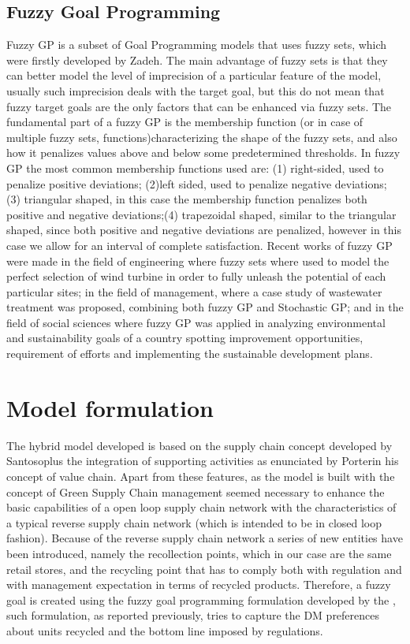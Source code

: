 \documentclass{article}
\begin{document}
  \subsection{Fuzzy Goal Programming}
  Fuzzy GP is a subset of Goal Programming models that uses fuzzy sets, which were firstly developed by Zadeh\cite{Zadeh_1965}. The main advantage of fuzzy sets is that they can better model the level of imprecision of a particular feature of the model, usually such imprecision deals with the target goal, but this do not mean that fuzzy target goals are the only factors that can be enhanced via fuzzy sets. The fundamental part of a fuzzy GP is the membership function (or in case of multiple fuzzy sets, functions)characterizing the shape of the fuzzy sets, and also how it penalizes values above and below some predetermined thresholds. In fuzzy GP the most common membership functions used are: (1) right-sided, used to penalize positive deviations; (2)left sided, used to penalize negative deviations; (3) triangular shaped, in this case the membership function penalizes both positive and negative deviations;(4) trapezoidal shaped, similar to the triangular shaped, since both positive and negative deviations are penalized, however in this case we allow for an interval of complete satisfaction.
  Recent works of fuzzy GP were made in the field of engineering where fuzzy sets where used to model the perfect selection of wind turbine in order to fully unleash the potential of each particular sites\cite{Rehman2017}; in the field of management, where a case study of wastewater treatment was proposed, combining both fuzzy GP and Stochastic GP\cite{Diaz-Madronero2018}; and in the field of social sciences where fuzzy GP was applied in analyzing environmental and sustainability goals of a country spotting improvement opportunities, requirement of efforts and implementing the sustainable development plans\cite{Nomani2016}.  
  \pagebreak

\section{Model formulation}
The hybrid model developed is based on the supply chain concept developed by Santoso\cite{Santoso_Ahmed_Goetschalckx_Shapiro_2005}plus the integration of supporting activities as enunciated by Porter\cite{CompetitiveAdvantage}in his concept of value chain. Apart from these features, as the model is built with the concept of Green Supply Chain management seemed necessary to enhance the basic capabilities of a open loop supply chain network with the characteristics of a typical reverse supply chain network (which is intended to be in closed loop fashion). Because of the reverse supply chain network a series of new entities have been introduced, namely the recollection points, which in our case are the same retail stores, and the recycling point that has to comply both with regulation and with management expectation in terms of recycled products. Therefore, a fuzzy goal is created using the fuzzy goal programming formulation developed by the \cite{YAGHOOBI2008}, such formulation, as reported previously, tries to capture the DM preferences about units recycled and the bottom line imposed by regulations.
\end{document}
